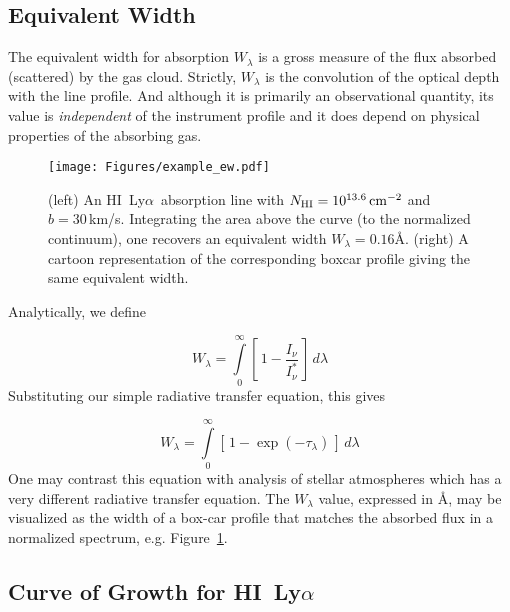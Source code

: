 \documentclass[graybox]{svmult}
\newcommand{\HI}{H{\sc I}}
\def\lya{Ly$\alpha$}
\def\ltk{\left [ \,}
\def\rtk{\, \right  ] }
\def\intl{\int\limits}
\newcommand{\mnhi}{N_{\rm HI}}
\def\cm#1{\, {\rm cm^{#1}}}
\begin{document}
\subsection{Equivalent Width}
\label{subsec:EW}

The equivalent width for absorption 
$W_\lambda$ is a gross measure of the 
flux absorbed (scattered) by the gas cloud.
Strictly, $W_\lambda$ is the convolution of the 
optical depth with the line profile.  
And although it is primarily an observational quantity,
its value is {\it independent} of the instrument profile
and it does depend on physical properties of the
absorbing gas.


%
\begin{figure}[b]
\sidecaption
\texttt{[image: Figures/example\_ew.pdf]}
%
%
\caption{(left) An \HI\ \lya\ absorption line with 
$\mnhi = 10^{13.6} \cm{-2}$ and $b=30$\,km/s.  Integrating
the area above the curve (to the normalized continuum),
one recovers an equivalent width $W_\lambda = 0.16$\AA.
(right) A cartoon representation of the corresponding
boxcar profile giving the same equivalent width.
}
\label{fig:EWbox}       %
\end{figure}


Analytically, we define

\begin{equation}
W_\lambda = \intl_0^\infty \ltk 1 - \frac{I_\nu}{I_\nu^*} \rtk \, d\lambda
\end{equation}
Substituting our simple radiative transfer equation, this gives

\begin{equation}
W_\lambda = \intl_0^\infty \ltk 1 - \exp(-\tau_\lambda) \rtk \, d\lambda
\label{eqn:EW}
\end{equation}
One may contrast this equation with analysis of stellar 
atmospheres which has
a very different radiative transfer equation.
The $W_\lambda$ value, expressed in \AA, may be
visualized as the width of a box-car profile
that matches the absorbed flux in a normalized 
spectrum, e.g. Figure~\ref{fig:EWbox}.

\subsection{Curve of Growth for \HI\ \lya}
\label{subsec:COGlya}
\end{document}
